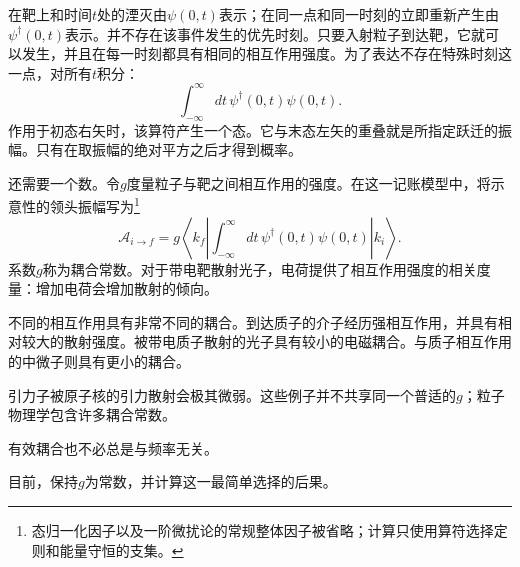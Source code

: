 在靶上和时间\(t\)处的湮灭由\(\psi(0,t)\)表示；在同一点和同一时刻的立即重新产生由\(\psi^\dagger(0,t)\)表示。并不存在该事件发生的优先时刻。只要入射粒子到达靶，它就可以发生，并且在每一时刻都具有相同的相互作用强度。为了表达不存在特殊时刻这一点，对所有\(t\)积分：
\begin{equation}
\int_{-\infty}^{\infty}dt\,\psi^\dagger(0,t)\psi(0,t).
\end{equation}
作用于初态右矢时，该算符产生一个态。它与末态左矢的重叠就是所指定跃迁的振幅。只有在取振幅的绝对平方之后才得到概率。

还需要一个数。令\(g\)度量粒子与靶之间相互作用的强度。在这一记账模型中，将示意性的领头振幅写为\footnote{态归一化因子以及一阶微扰论的常规整体因子被省略；计算只使用算符选择定则和能量守恒的支集。}
\begin{equation}
\mathcal A_{i\to f}
=g\left\langle k_f\left|
\int_{-\infty}^{\infty}dt\,
\psi^\dagger(0,t)\psi(0,t)
\right|k_i\right\rangle.
\end{equation}
系数\(g\)称为耦合常数。对于带电靶散射光子，电荷提供了相互作用强度的相关度量：增加电荷会增加散射的倾向。

不同的相互作用具有非常不同的耦合。到达质子的介子经历强相互作用，并具有相对较大的散射强度。被带电质子散射的光子具有较小的电磁耦合。与质子相互作用的中微子则具有更小的耦合。

\begin{classroomqa}
\end{classroomqa}

引力子被原子核的引力散射会极其微弱。这些例子并不共享同一个普适的\(g\)；粒子物理学包含许多耦合常数。

有效耦合也不必总是与频率无关。

\begin{classroomqa}
\end{classroomqa}

目前，保持\(g\)为常数，并计算这一最简单选择的后果。

\begin{classroomqa}
\end{classroomqa}

